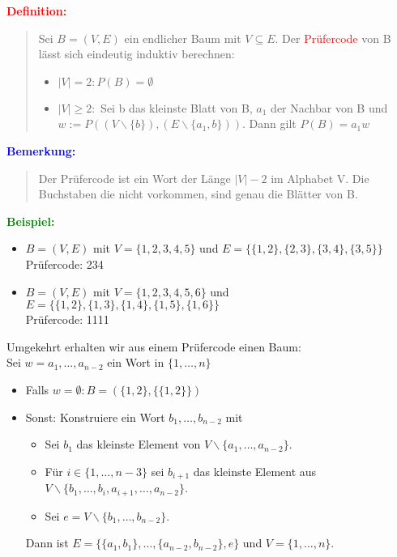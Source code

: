 \documentclass{article}
\newcommand{\red}[1]{\textcolor{red}{#1}}
\newcommand{\blue}[1]{\textcolor{blue}{#1}}
\newcommand{\green}[1]{\textcolor{green}{#1}}
\newcommand{\ex}{\green{\textbf{Beispiel: }}}
\newcommand{\de}[1]{\red{\textbf{Definition: }}\begin{quote}#1\end{quote}}
\newcommand{\an}[1]{\blue{\textbf{Bemerkung: }}\begin{quote}#1\end{quote}}
\newcommand{\bs}{\backslash}
\begin{document}
\de{
    Sei $B = (V,E)$ ein endlicher Baum mit $V \subseteq E$. Der \red{Prüfercode} von B lässt sich eindeutig induktiv berechnen:
    \begin{itemize}
        \item $|V| = 2: P(B) = \emptyset$
        \item $|V| \ge 2:$ Sei b das kleinste Blatt von B, $a_1$ der Nachbar von B und $w := P((V \bs \{b\}), (E \bs \{a_1, b\}))$. Dann gilt $P(B) = a_1w$
    \end{itemize}
}

\an{
    Der Prüfercode ist ein Wort der Länge $|V| - 2$ im Alphabet V. Die Buchstaben die nicht vorkommen, sind genau die Blätter von B.
}

\ex
\begin{itemize}
    \item $B = (V,E)$ mit $V = \{1,2,3,4,5\}$ und $E = \{\{1,2\}, \{2,3\}, \{3,4\}, \{3,5\}\}$\\
    Prüfercode: 234
    \item $B = (V,E)$ mit $V = \{1,2,3,4,5,6\}$ und\\
    $E =  \{\{1,2\}, \{1,3\}, \{1,4\}, \{1,5\}, \{1,6\}\}$\\
    Prüfercode: 1111
\end{itemize}

Umgekehrt erhalten wir aus einem Prüfercode einen Baum:\\
Sei $w = a_1, \dots, a_{n-2}$ ein Wort in $\{1, \dots, n\}$
\begin{itemize}
    \item Falls $w =\emptyset: B = (\{1,2\}, \{\{1,2\}\})$ 
    \item Sonst: Konstruiere ein Wort $b_1, \dots, b_{n-2}$ mit
    \begin{itemize}
        \item Sei $b_1$ das kleinste Element von $V \bs \{a_1, \dots, a_{n-2}\}$.
        \item Für $i \in \{1, \dots, n-3\}$ sei $b_{i+1}$ das kleinste Element aus\\
        $V \bs \{b_1, \dots, b_i, a_{i+1}, \dots, a_{n-2}\}$.
        \item Sei $e = V \bs \{b_1, \dots, b_{n-2}\}$.
    \end{itemize}
    Dann ist $E = \{\{a_1, b_1\}, \dots, \{a_{n-2}, b_{n-2}\}, e\}$ und $V = \{1, \dots, n\}$.
\end{itemize}
\end{document}

